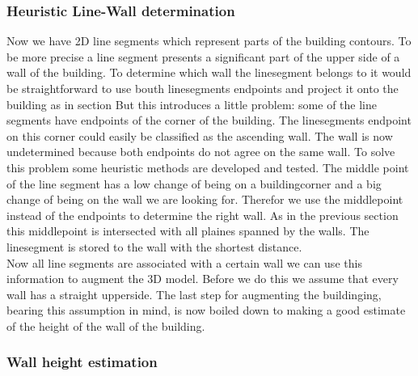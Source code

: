 \subsubsection{Heuristic Line-Wall determination}
	Now we have 2D line segments which represent parts of the building contours. To be more precise a line segment presents a significant part of the upper side of a wall of the building.
	To determine which wall the linesegment belongs to it would be straightforward to use bouth linesegments endpoints and project it onto the building as in section %
	But this introduces a little problem: some of the line segments have endpoints of the corner of the building.
	The linesegments endpoint on this corner could easily be classified as the ascending wall.
	The wall is now undetermined because both endpoints do not agree on the same wall.  
	To solve this problem some heuristic methods are developed and tested.
	The middle point of the line segment has a low change of being on a buildingcorner and a big change of being on the wall we are looking for.
	Therefor we use the middlepoint instead of the endpoints to determine the right wall.
	As in the previous section %
	this middlepoint is intersected with all plaines spanned by the walls. The linesegment is stored to the wall with the shortest distance.
	\\
	Now all line segments are associated with a certain wall we can use this information to augment the 3D model.
	Before we do this we assume that every wall has a straight upperside. %
	The last step for augmenting the buildinging, bearing this assumption in mind, is now boiled down to making a good estimate of the height of the wall of the building.

	


\subsubsection{Wall height estimation}

